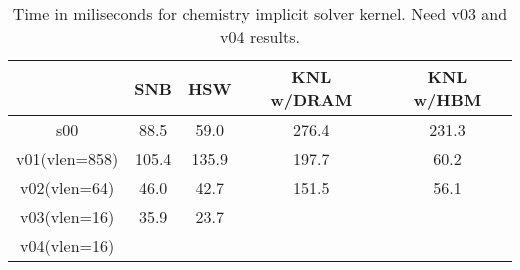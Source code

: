 \begin{table}
\begin{center}
\begin{tabular}{|c|c|c|c|c|}
\hline
               & SNB    & HSW & KNL w/DRAM & KNL w/HBM \\
\hline \hline
s00            &  88.5  & 59.0  &  276.4 & 231.3 \\
v01(vlen=858)  &  105.4 & 135.9 &  197.7 &  60.2 \\
v02(vlen=64)   &   46.0 &  42.7 &  151.5 &  56.1 \\
v03(vlen=16)   &   35.9 &  23.7 &        &       \\
v04(vlen=16)   &        &       &        &       \\
\hline
\end{tabular}
\caption{Time in miliseconds for chemistry implicit solver kernel. {\color{red} Need v03 and v04 results. }\label{tbl:chem-timing}}
\end{center}
\end{table}
